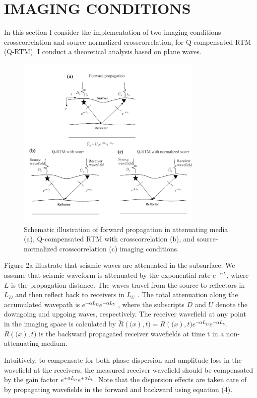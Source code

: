 \section{IMAGING CONDITIONS}
In this section I consider the implementation of two imaging conditions – crosscorrelation and source-normalized crosscorrelation, for Q-compensated RTM (Q-RTM). I conduct a theoretical analysis based on plane waves. 
 \begin{figure}[!htb]
   \centering
   \includegraphics[width=0.8\textwidth]{Fig/fig2-eps-converted-to}
   \caption{Schematic illustration of forward propagation in attenuating media (a), Q-compensated RTM with crosscorrelation (b), and source-normalized crosscorrelation (c) imaging conditions.}
 \end{figure}

Figure 2a illustrate that seismic waves are attenuated in the subsurface. We assume that seismic waveform is attenuated by the exponential rate  $e^{-\alpha L}$, where $L$ is the propagation distance. The waves travel from the source to reflectors in $L_{D}$  and then reflect back to receivers in $L_{U}$ . The total attenuation along the accumulated wavepath is $e^{-\alpha L_D}e^{-\alpha L_U}$ , where the subscripts $D$ and $U$ denote the downgoing and upgoing waves, respectively. The receiver wavefield at any point   in the imaging space is calculated by  $\tilde{R}(\mathbf(x),t)=R(\mathbf(x),t)e^{-\alpha L_D}e^{-\alpha L_U}$.  $R(\mathbf(x),t)$ is the backward propagated receiver wavefields at time t in a non-attenuating medium.

Intuitively, to compensate for both phase dispersion and amplitude loss in the wavefield at the receivers, the measured receiver wavefield should be compensated by the gain factor  $e^{+\alpha L_D}e^{+\alpha L_U}$. Note that the dispersion effects are taken care of by propagating wavefields in the forward and backward using equation (4). 

